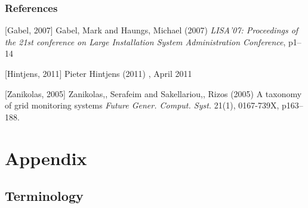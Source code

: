 \documentclass{beamer}
\renewcommand\appendixname{Appendix}
\begin{document}
\begin{frame}
\frametitle{References}
\footnotesize{
\begin{thebibliography}{99} %

[Gabel, 2007] {Gabel, Mark and Haungs, Michael} (2007)
\newblock \emph{LISA'07: Proceedings of the 21st conference on Large Installation System Administration Conference}, p1--14

[Hintjens, 2011] {Pieter Hintjens} (2011)
, April 2011

[Zanikolas, 2005] {Zanikolas,, Serafeim and Sakellariou,, Rizos} (2005)
\newblock A taxonomy of grid monitoring systems
\newblock \emph{Future Gener. Comput. Syst.} 21(1), 0167-739X, p163--188.

\end{thebibliography}
}
\end{frame}


\appendix

\section{\appendixname}
\frame{\tableofcontents}

\subsection{Terminology}
\end{document}
